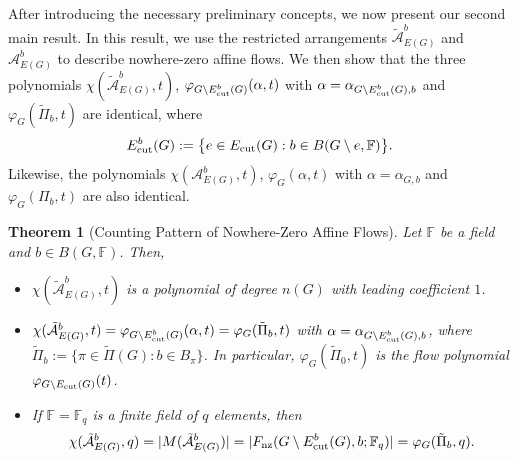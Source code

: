 \documentclass[12pt]{article}%
\renewcommand*{\bm}[1]{#1}%
\numberwithin{equation}{section}
\newtheorem{theorem}{Theorem}[section]
\begin{document}
After introducing the necessary preliminary concepts, we now present our second main result. In this result, we use the restricted arrangements $\tilde{\mathcal{A}}_{E(G)}^{\bm b}$ and $\mathcal{A}_{E(G)}^{\bm b}$  to describe nowhere-zero affine flows.  We then show that the three polynomials $\chi(\tilde{\mathcal{A}}_{E(G)}^{\bm b},t)$, $\varphi_{G\setminus E_{\rm cut}^{\bm b}(G)}(\alpha,t)$ with $\alpha=\alpha_{G\setminus E_{\rm cut}^{\bm b}(G),\bm b}$ and $\varphi_G(\tilde{\Pi}_{\bm b},t)$ are identical, where
\[
E_{\rm cut}^{\bm b}(G):=\big\{e\in E_{\rm cut}(G):\bm b\in B(G\setminus e,\mathbb{F})\big\}.
\]
Likewise, the polynomials $\chi(\mathcal{A}_{E(G)}^{\bm b},t)$, $\varphi_G(\alpha,t)$ with $\alpha=\alpha_{G,\bm b}$ and $\varphi_G(\Pi_{\bm b},t)$ are also identical.
\begin{theorem}[Counting Pattern of Nowhere-Zero Affine Flows]\label{thm:nowhere-zero affine flow counting}
Let $\mathbb{F}$ be a field and $\bm b\in B(G,\mathbb{F})$.  Then,
\begin{itemize}
\item [{\rm (a)}]
$\chi(\tilde{\mathcal{A}}_{E(G)}^{\bm b},t)$ is a polynomial of degree $n(G)$ with leading coefficient $1$. 
\item[{\rm (b)}] $\chi(\tilde{\mathcal{A}}_{E(G)}^{\bm b},t)=\varphi_{G\setminus E_{\rm cut}^{\bm b}(G)}(\alpha,t)=\varphi_G(\tilde{\Pi}_{\bm b},t)$ with $\alpha=\alpha_{G\setminus E_{\rm cut}^{\bm b}(G),\bm b}$, where $\tilde{\Pi}_{\bm b}:=\big\{\pi\in\tilde{\Pi}(G):\bm b\in B_{\pi}\big\}$. In particular, $\varphi_G(\tilde{\Pi}_{\bm 0},t)$ is the flow polynomial $\varphi_{G\setminus E_{\rm cut}(G)}(t)$.
\item[{\rm (c)}]If $\mathbb{F}=\mathbb{F}_q$ is a finite field of $q$ elements, then
\[
\chi(\tilde{\mathcal{A}}_{E(G)}^{\bm b},q)=|M(\tilde{\mathcal{A}}_{E(G)}^{\bm b})|=|F_{\rm nz}(G\setminus E^{\bm b}_{\rm cut}(G),\bm b;\mathbb{F}_q)|=\varphi_G(\tilde{\Pi}_{\bm b},q).
\]
\end{itemize}
\end{theorem}
\end{document}
